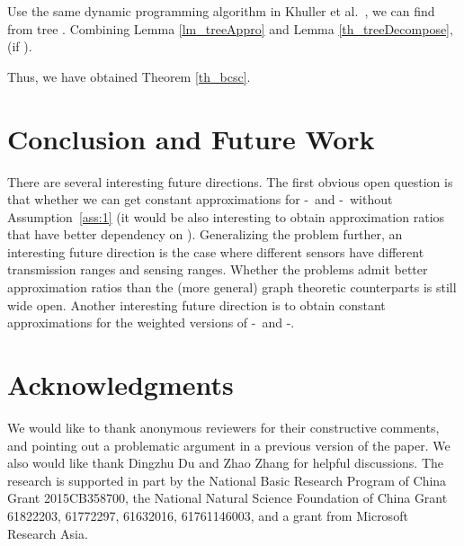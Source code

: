 \documentclass[11pt]{article}
\newcommand{\mincsc}{-}
\newcommand{\bcsc}{-}
\begin{document}
Use the same dynamic programming algorithm in Khuller et al.~\cite{khuller2014analyzing},
we can find  from tree .
Combining Lemma \ref{lm_treeAppro} and Lemma \ref{th_treeDecompose},
 (if ).

Thus, we have obtained Theorem \ref{th_bcsc}.



\section{Conclusion and Future Work}
There are several interesting future directions.
The first obvious open question is that whether we
can get constant approximations for \mincsc\ and \bcsc\ without Assumption~\ref{ass:1}
(it would be also interesting to obtain approximation ratios that have better dependency on ).
Generalizing the problem further, an interesting future direction is the case where
different sensors have different transmission ranges and sensing ranges.
Whether the problems admit better approximation ratios than the (more general) graph theoretic
counterparts is still wide open.
Another interesting future direction is to obtain constant approximations for the weighted versions of  \mincsc\ and \bcsc.

\section{Acknowledgments}

We would like to thank anonymous reviewers for their constructive comments,
and pointing out a problematic argument in a previous version of the paper.
We also would like thank Dingzhu Du and Zhao Zhang for helpful discussions.
The research is supported in part by the National Basic Research Program of China Grant 2015CB358700, 
the National Natural Science Foundation of China Grant 61822203, 61772297, 61632016, 61761146003,
and a grant from Microsoft Research Asia.




\end{document}
